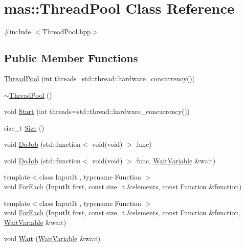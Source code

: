 \hypertarget{classmas_1_1_thread_pool}{\section{mas\-:\-:Thread\-Pool Class Reference}
\label{classmas_1_1_thread_pool}
}


{\ttfamily \#include $<$Thread\-Pool.\-hpp$>$}

\subsection*{Public Member Functions}
\begin{DoxyCompactItemize}
\item 
\hyperlink{classmas_1_1_thread_pool_a998a51176494008a004b0cb3bc8bc90d}{Thread\-Pool} (int threads=std\-::thread\-::hardware\-\_\-concurrency())
\item 
\hyperlink{classmas_1_1_thread_pool_acbe1a4ea524e3a0327d2c3410d2166d9}{$\sim$\-Thread\-Pool} ()
\item 
void \hyperlink{classmas_1_1_thread_pool_adb233f77a0223233df65ff93d4266d73}{Start} (int threads=std\-::thread\-::hardware\-\_\-concurrency())
\item 
size\-\_\-t \hyperlink{classmas_1_1_thread_pool_a708cb76e2e04cbd4e60d091cf41c4b02}{Size} ()
\item 
void \hyperlink{classmas_1_1_thread_pool_af17fcfd1493ec7701b6c5b9d3f1c8cd9}{Do\-Job} (std\-::function$<$ void(void) $>$ func)
\item 
void \hyperlink{classmas_1_1_thread_pool_ae72b5b3eec0b250913e2258ce1bdee53}{Do\-Job} (std\-::function$<$ void(void) $>$ func, \hyperlink{classmas_1_1_wait_variable}{Wait\-Variable} \&wait)
\item 
{\footnotesize template$<$class Input\-It , typename Function $>$ }\\void \hyperlink{classmas_1_1_thread_pool_a74e8c3a26b648485e3a89fd7d49642b2}{For\-Each} (Input\-It first, const size\-\_\-t \&elements, const Function \&function)
\item 
{\footnotesize template$<$class Input\-It , typename Function $>$ }\\void \hyperlink{classmas_1_1_thread_pool_a570cdbcc54ce762741f4c0b26544c217}{For\-Each} (Input\-It first, const size\-\_\-t \&elements, const Function \&function, \hyperlink{classmas_1_1_wait_variable}{Wait\-Variable} \&wait)
\item 
void \hyperlink{classmas_1_1_thread_pool_ac65fc8a658c95356abd72a1506dc74cc}{Wait} (\hyperlink{classmas_1_1_wait_variable}{Wait\-Variable} \&wait)
\end{DoxyCompactItemize}
